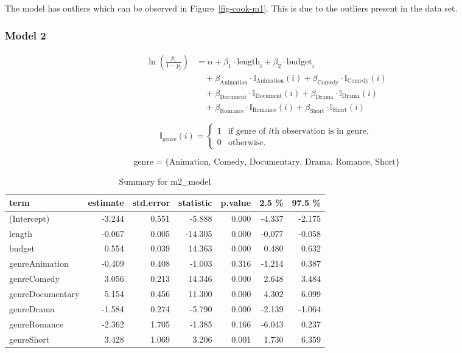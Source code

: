 \documentclass[
  letterpaper,
  DIV=11,
  numbers=noendperiod]{scrartcl}
\begin{document}
The model has outliers which can be observed in
Figure~\ref{fig-cook-m1}. This is due to the outliers present in the
data set.

\hypertarget{sec-m2.model}{%
\subsubsection{Model 2}\label{sec-m2.model}}

\[\begin{aligned}
\ln\left(\frac{p_i}{1-p_i}\right) &= \alpha + \beta_1 \cdot \textrm{length}_i + \beta_2 \cdot \textrm{budget}_i \\
&\quad + \beta_{\textrm{Animation}} \cdot \mathbb{I}_{\textrm{Animation}}(i) + \beta_{\textrm{Comedy}} \cdot \mathbb{I}_{\textrm{Comedy}}(i) \\
&\quad + \beta_{\textrm{Document}} \cdot \mathbb{I}_{\textrm{Document}}(i) + \beta_{\textrm{Drama}} \cdot \mathbb{I}_{\textrm{Drama}}(i) \\
&\quad + \beta_{\textrm{Romance}} \cdot \mathbb{I}_{\textrm{Romance}}(i) + \beta_{\textrm{Short}} \cdot \mathbb{I}_{\textrm{Short}}(i)
\end{aligned}\]

\[\mathbb{I}_{\textrm{genre}}(i) = \begin{cases}
1 & \textrm{if genre of } i\textrm{th observation is in genre}, \\
0 & \textrm{otherwise}.
\end{cases}\]

\[\textrm{genre} = \{\textrm{Animation, Comedy, Documentary, Drama, Romance, Short}\}\]
\clearpage

\hypertarget{tbl-m2_model-Summary}{}
\begin{longtable}{lrrrrrr}
\caption{\label{tbl-m2_model-Summary}Summary for m2\_model }\tabularnewline

\toprule
term & estimate & std.error & statistic & p.value & 2.5 \% & 97.5 \% \\ 
\midrule\addlinespace[2.5pt]
(Intercept) & -3.244 & 0.551 & -5.888 & 0.000 & -4.337 & -2.175 \\ 
length & -0.067 & 0.005 & -14.305 & 0.000 & -0.077 & -0.058 \\ 
budget & 0.554 & 0.039 & 14.363 & 0.000 & 0.480 & 0.632 \\ 
genreAnimation & -0.409 & 0.408 & -1.003 & 0.316 & -1.214 & 0.387 \\ 
genreComedy & 3.056 & 0.213 & 14.346 & 0.000 & 2.648 & 3.484 \\ 
genreDocumentary & 5.154 & 0.456 & 11.300 & 0.000 & 4.302 & 6.099 \\ 
genreDrama & -1.584 & 0.274 & -5.790 & 0.000 & -2.139 & -1.064 \\ 
genreRomance & -2.362 & 1.705 & -1.385 & 0.166 & -6.043 & 0.237 \\ 
genreShort & 3.428 & 1.069 & 3.206 & 0.001 & 1.730 & 6.359 \\ 
\bottomrule
\end{longtable}
\end{document}
